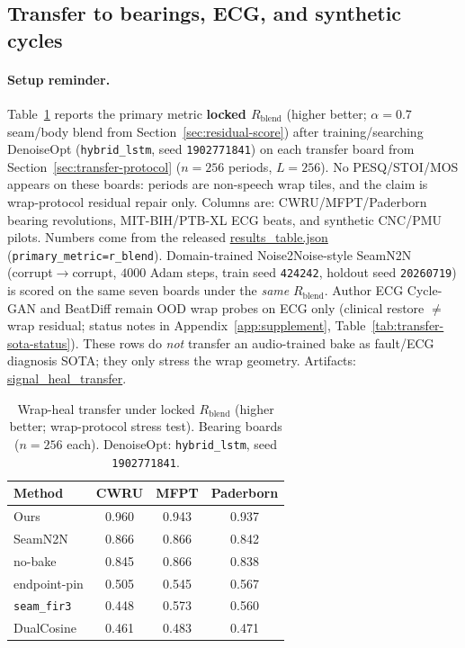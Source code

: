 \subsection{Transfer to bearings, ECG, and synthetic cycles}
\label{sec:transfer-main}

\paragraph{Setup reminder.}
Table~\ref{tab:transfer-main} reports the primary metric \textbf{locked $R_{\mathrm{blend}}$} (higher better; $\alpha{=}0.7$ seam/body blend from Section~\ref{sec:residual-score}) after training/searching DenoiseOpt
(\texttt{hybrid\_lstm}, seed \texttt{1902771841}) on each transfer board
from Section~\ref{sec:transfer-protocol} ($n{=}256$ periods, $L{=}256$).
No PESQ/STOI/MOS appears on these boards: periods are non-speech wrap tiles, and the claim is wrap-protocol residual repair only.
Columns are: CWRU/MFPT/Paderborn bearing revolutions, MIT-BIH/PTB-XL ECG beats, and synthetic CNC/PMU pilots.
Numbers come from the released
\href{https://github.com/reeldemo/reelsynth/blob/main/brand/artifacts/signal_heal_transfer/results_table.json}{results\_table.json}
(\texttt{primary\_metric=r\_blend}).
Domain-trained Noise2Noise-style SeamN2N (corrupt$\to$corrupt, $4000$ Adam steps, train seed \texttt{424242}, holdout seed \texttt{20260719})
is scored on the same seven boards under the \emph{same} $R_{\mathrm{blend}}$.
Author ECG Cycle-GAN and BeatDiff remain OOD wrap probes on ECG only
(clinical restore $\neq$ wrap residual; status notes in Appendix~\ref{app:supplement}, Table~\ref{tab:transfer-sota-status}).
These rows do \emph{not} transfer an audio-trained bake as fault/ECG diagnosis SOTA; they only stress the wrap geometry.
Artifacts:
\href{https://github.com/reeldemo/reelsynth/tree/main/brand/artifacts/signal_heal_transfer}{signal\_heal\_transfer}.

\begin{table}[t]
  \centering
  \caption{Wrap-heal transfer under locked $R_{\mathrm{blend}}$ (higher better; wrap-protocol stress test).
  Bearing boards ($n{=}256$ each). DenoiseOpt: \texttt{hybrid\_lstm}, seed \texttt{1902771841}.}
  \label{tab:transfer-main}
  \setlength{\tabcolsep}{3pt}
  \footnotesize
  \begin{tabular}{@{}lccc@{}}
    \toprule
    Method & CWRU & MFPT & Paderborn \\
    \midrule
    Ours & 0.960 & 0.943 & 0.937 \\
    SeamN2N & 0.866 & 0.866 & 0.842 \\
    no-bake & 0.845 & 0.866 & 0.838 \\
    endpoint-pin & 0.505 & 0.545 & 0.567 \\
    \texttt{seam\_fir3} & 0.448 & 0.573 & 0.560 \\
    DualCosine & 0.461 & 0.483 & 0.471 \\
    \bottomrule
  \end{tabular}
\end{table}

